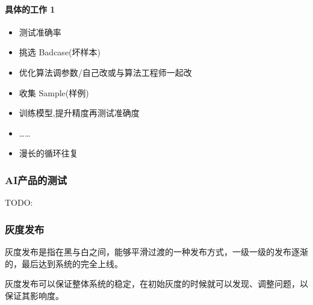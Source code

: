 \documentclass[letterpaper,11pt,english]{sphinxmanual}
\begin{document}
\paragraph{具体的工作 1\sphinxfootnotemark[862]}
\label{\detokenize{chapter_AI_dive/real:id2}}%
\begin{footnotetext}[862]\sphinxAtStartFootnote
{}
%
\end{footnotetext}\ignorespaces \begin{itemize}
\item {} 
测试准确率

\item {} 
挑选 Badcase(坏样本)

\item {} 
优化算法调参数/自己改或与算法工程师一起改

\item {} 
收集 Sample(样例)

\item {} 
训练模型,提升精度再测试准确度

\item {} 
……

\item {} 
漫长的循环往复

\end{itemize}


\subsubsection{AI产品的测试}
\label{\detokenize{chapter_AI_dive/AI_test:ai}}\label{\detokenize{chapter_AI_dive/AI_test::doc}}
TODO: 


\subsubsection{灰度发布}
\label{\detokenize{chapter_AI_dive/huidu:id1}}\label{\detokenize{chapter_AI_dive/huidu::doc}}
灰度发布是指在黑与白之间，能够平滑过渡的一种发布方式，一级一级的发布逐渐的，最后达到系统的完全上线。 %
\begin{footnote}[863]\sphinxAtStartFootnote
{}
%
\end{footnote}

灰度发布可以保证整体系统的稳定，在初始灰度的时候就可以发现、调整问题，以保证其影响度。
\end{document}
